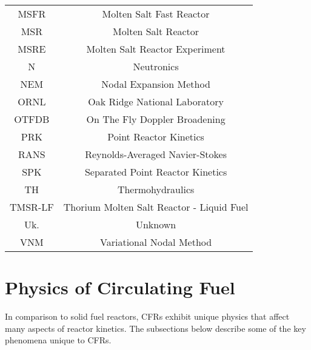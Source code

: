 \documentclass[review]{elsarticle}
\begin{document}
\begin{table}[h]
\begin{center}
\begin{tabular}{|c c|}
            MSFR & Molten Salt Fast Reactor \\
            MSR & Molten Salt Reactor \\
            MSRE & Molten Salt Reactor Experiment \\
            N & Neutronics \\
            NEM & Nodal Expansion Method \\
            ORNL & Oak Ridge National Laboratory \\
            OTFDB & On The Fly Doppler Broadening \\
            PRK & Point Reactor Kinetics \\
            RANS & Reynolds-Averaged Navier-Stokes \\
            SPK & Separated Point Reactor Kinetics \\
            TH & Thermohydraulics \\
            TMSR-LF & Thorium Molten Salt Reactor - Liquid Fuel \\
            Uk. & Unknown \\
            VNM & Variational Nodal Method \\
            \hline
        \end{tabular}
    \end{center}
\end{table}

\section{Physics of Circulating Fuel} \label{sec:physics}
In comparison to solid fuel reactors, CFRs exhibit unique
physics that affect many aspects of reactor kinetics. The subsections below 
describe some of the key phenomena unique to CFRs.
\end{document}
